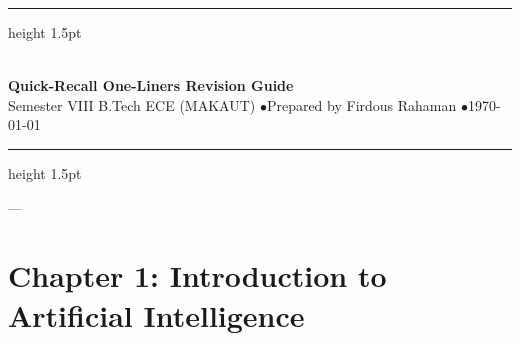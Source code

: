 \documentclass[11pt,a4paper]{article}
\begin{document}
\begin{center}
  \vspace*{-0.3in}
  {\hrule height 1.5pt} \vspace{0.25cm}
  {\Huge\bfseries\color{darkblue}} \\[0.2cm]
  {\Large\bfseries\color{secondary}\sffamily Quick-Recall One-Liners Revision Guide} \\[0.25cm]
  {\small\sffamily\color{secondary} Semester VIII B.Tech ECE (MAKAUT) \quad$\bullet$\quad Prepared by Firdous Rahaman \quad$\bullet$\quad \today} \\[0.2cm]
  {\hrule height 1.5pt}
  \vspace{1.0em}
\end{center}
\thispagestyle{plain}


---

\section*{Chapter 1: Introduction to Artificial Intelligence}
\end{document}
